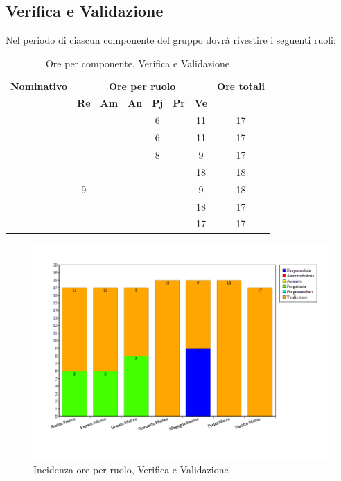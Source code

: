 \subsection{Verifica e Validazione}
Nel periodo di \VV ciascun componente del gruppo dovrà rivestire i seguenti ruoli:
\begin{table}[H]
	\begin{center}
		\begin{tabular}{|c|c|c|c|c|c|c|c|}
			\hline
			\textbf{Nominativo} & \multicolumn{6}{c|}{\textbf{Ore per ruolo}} & \textbf{Ore totali} \\
			& \textbf{Re} & \textbf{Am} & \textbf{An} & \textbf{Pj} & \textbf{Pr} & \textbf{Ve} & \\
			\hline
			\FB		&		&		&		&	6	&		&	11	&	17	\\
			\hline
			\AF		&		&		&		&	 6	&		&	11	& 	17	\\
			\hline	
			\GN		&		&		&		&	8	&		&	9	&	17	\\
			\hline								
			\GR	&		&	 	&		&		&	 	& 	18	&	18	\\
			\hline
			\SM 		&	9	&		&		&		&		& 	9	&	18	\\
			\hline	
			\MP 		& 		&		&		&		&		&	18	&	17	\\
			\hline					
			\MV 		&		&		&		&		&		&	17	& 	17	\\
			\hline
		\end{tabular}
	\end{center}
	\caption{Ore per componente, Verifica e Validazione}
\end{table}

\begin{figure}[H]
	\centering
	\includegraphics[scale=0.4]{immagini/Grafi/GrafoVV}
	\caption{Incidenza ore per ruolo, Verifica e Validazione}
\end{figure}

